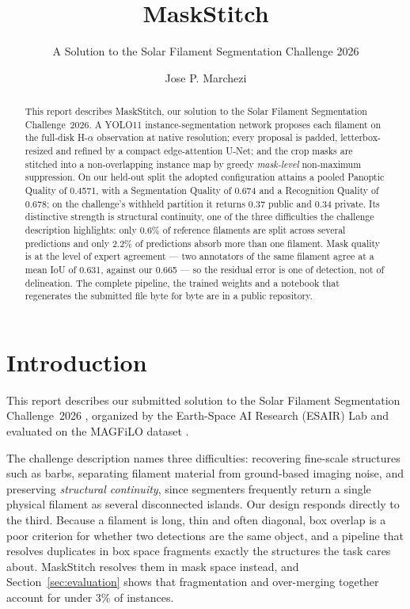 \documentclass[sigconf]{acmart}
\begin{document}
\title{MaskStitch}
\subtitle{A Solution to the Solar Filament Segmentation Challenge 2026} %


\author{Jose P. Marchezi}

\begin{abstract}
    This report describes MaskStitch, our solution to the Solar Filament Segmentation Challenge~2026. A YOLO11 instance-segmentation network proposes each filament on the full-disk H-$\alpha$ observation at native resolution; every proposal is padded, letterbox-resized and refined by a compact edge-attention U-Net; and the crop masks are stitched into a non-overlapping instance map by greedy \emph{mask-level} non-maximum suppression. On our held-out split the adopted configuration attains a pooled Panoptic Quality of 0.4571, with a Segmentation Quality of 0.674 and a Recognition Quality of 0.678; on the challenge's withheld partition it returns 0.37 public and 0.34 private. Its distinctive strength is structural continuity, one of the three difficulties the challenge description highlights: only 0.6\% of reference filaments are split across several predictions and only 2.2\% of predictions absorb more than one filament. Mask quality is at the level of expert agreement --- two annotators of the same filament agree at a mean IoU of 0.631, against our 0.665 --- so the residual error is one of detection, not of delineation. The complete pipeline, the trained weights and a notebook that regenerates the submitted file byte for byte are in a public repository.
\end{abstract}

\maketitle

\section{Introduction}
    This report describes our submitted solution to the Solar Filament Segmentation Challenge~2026 \cite{filament-segmentation-2026}, organized by the Earth-Space AI Research (ESAIR) Lab and evaluated on the MAGFiLO dataset \cite{ahmadzadeh2024dataset}.

    The challenge description names three difficulties: recovering fine-scale structures such as barbs, separating filament material from ground-based imaging noise, and preserving \emph{structural continuity}, since segmenters frequently return a single physical filament as several disconnected islands. Our design responds directly to the third. Because a filament is long, thin and often diagonal, box overlap is a poor criterion for whether two detections are the same object, and a pipeline that resolves duplicates in box space fragments exactly the structures the task cares about. MaskStitch resolves them in mask space instead, and Section~\ref{sec:evaluation} shows that fragmentation and over-merging together account for under 3\% of instances.
\end{document}
